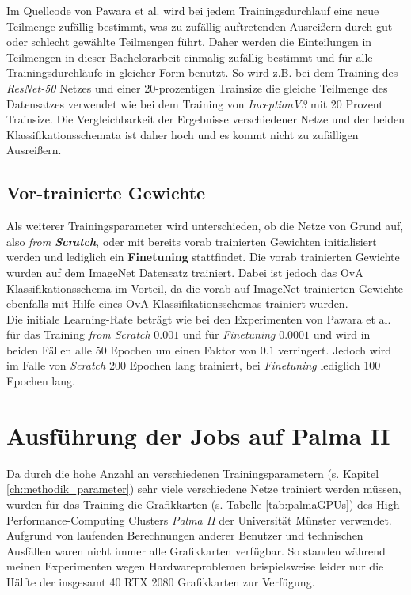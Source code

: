 Im Quellcode von Pawara et al. \cite{pawaraWebsiteCode} wird bei jedem Trainingsdurchlauf eine neue Teilmenge zufällig bestimmt, was zu zufällig auftretenden Ausreißern durch gut oder schlecht gewählte Teilmengen führt.
Daher werden die Einteilungen in Teilmengen in dieser Bachelorarbeit einmalig zufällig bestimmt und für alle Trainingsdurchläufe in gleicher Form benutzt. So wird z.B. bei dem Training des \textit{ResNet-50} Netzes und einer 20-prozentigen Trainsize die gleiche Teilmenge des Datensatzes verwendet wie bei dem Training von \textit{InceptionV3} mit 20 Prozent Trainsize. Die Vergleichbarkeit der Ergebnisse verschiedener Netze und der beiden Klassifikationsschemata ist daher hoch und es kommt nicht zu zufälligen Ausreißern.

\subsection{Vor-trainierte Gewichte}
\label{ch:methodik_gewichte}
Als weiterer Trainingsparameter wird unterschieden, ob die Netze von Grund auf, also \textit{from \textbf{Scratch}}, oder mit bereits vorab trainierten Gewichten initialisiert werden und lediglich ein \textbf{Finetuning} stattfindet. Die vorab trainierten Gewichte wurden auf dem ImageNet Datensatz \cite{imagenet} trainiert.
Dabei ist jedoch das OvA Klassifikationsschema im Vorteil, da die vorab auf ImageNet \cite{imagenet} trainierten Gewichte ebenfalls mit Hilfe eines OvA Klassifikationsschemas trainiert wurden.\\

Die initiale Learning-Rate beträgt wie bei den Experimenten von Pawara et al. \cite{pawaraPaper} für das Training \textit{from Scratch} $0.001$ und für \textit{Finetuning} $0.0001$ und wird in beiden Fällen alle 50 Epochen um einen Faktor von $0.1$ verringert. Jedoch wird im Falle von \textit{Scratch} 200 Epochen lang trainiert, bei \textit{Finetuning} lediglich 100 Epochen lang.



\section{Ausführung der Jobs auf Palma II}
\label{ch:methodik_palma}
Da durch die hohe Anzahl an verschiedenen Trainingsparametern (s. Kapitel \ref{ch:methodik_parameter}) sehr viele verschiedene Netze trainiert werden müssen, wurden für das Training die Grafikkarten (s. Tabelle \ref{tab:palmaGPUs}) des High-Performance-Computing Clusters \textit{Palma II} der Universität Münster \cite{palma2} verwendet.\\
Aufgrund von laufenden Berechnungen anderer Benutzer und technischen Ausfällen waren nicht immer alle Grafikkarten verfügbar. So standen während meinen Experimenten wegen Hardwareproblemen beispielsweise leider nur die Hälfte der insgesamt 40 RTX 2080 Grafikkarten zur Verfügung.

